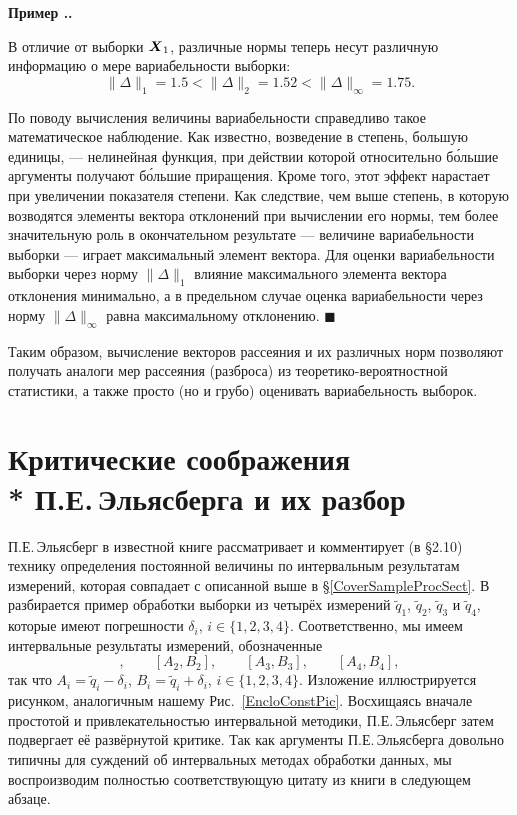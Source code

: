 \documentclass[a5paper,openany]{book}
\newcommand{\mbf}[1]{\protect\text{\boldmath$#1$}}
\newcounter{ExmpNum}[section]
\renewcommand{\theExmpNum}{\thesection.\arabic{ExmpNum}}
\newenvironment{example}%
  {\refstepcounter{ExmpNum}%
  \par\addvspace{\medskipamount} 
  \noindent\textbf{Пример {\theExmpNum}.}
  }%
  {\hfill$\blacksquare$\par\medskip}
\begin{document}
\begin{example}
В отличие от выборки $\mbf{X}_1$, различные нормы теперь несут различную информацию о мере вариабельности выборки:
\begin{equation*}
	 \| \Delta \|_1 = 1.5 <  \| \Delta \|_2 = 1.52 < \| \Delta \|_{\infty}= 1.75. 
\end{equation*}	
  
По поводу вычисления величины вариабельности справедливо такое математическое наблюдение. 
Как известно, возведение в степень, большую единицы, --- нелинейная функция, при действии 
которой относительно б\'{о}льшие аргументы получают б\'{о}льшие приращения. Кроме того, 
этот эффект нарастает при увеличении показателя степени. Как следствие, чем выше степень, 
в которую возводятся элементы вектора отклонений при вычислении его нормы, тем более 
значительную роль в окончательном результате --- величине вариабельности выборки --- 
играет максимальный элемент вектора. Для оценки вариабельности выборки через норму 
$\| \Delta \|_1$ влияние максимального элемента вектора отклонения минимально, а 
в предельном случае оценка вариабельности через норму $\| \Delta \|_{\infty}$ равна 
максимальному отклонению. 
\end{example} 
  
Таким образом, вычисление векторов рассеяния и их различных норм позволяют 
получать аналоги мер рассеяния (разброса) из теоретико-вероятностной статистики, 
а также просто (но и грубо) оценивать вариабельность выборок. 
  
  
\section[Критические соображения П.Е.\,Эльясберга и их разбор]%
        {Критические соображения\\* П.Е.\,Эльясберга и их разбор} 
  
  
П.Е.\,Эльясберг в известной книге \cite{Eliasberg83} рассматривает и комментирует 
(в \S 2.10) технику определения постоянной величины по интервальным результатам 
измерений, которая совпадает с описанной выше в  \S\ref{CoverSampleProcSect}. 
В \cite{Eliasberg83} разбирается пример обработки выборки из четырёх измерений 
$\tilde{q}_1$, $\tilde{q}_2$, $\tilde{q}_3$ и $\tilde{q}_4$, которые имеют погрешности 
$\delta_i$, $i\in\{1,2,3,4\}$. Соответственно, мы имеем интервальные результаты 
измерений, обозначенные 
\begin{equation*} 
[A_{1}, B_{1}], \qquad [A_{2}, B_{2}], \qquad [A_{3}, B_{3}],  \qquad [A_{4}, B_{4}], 
\end{equation*} 
так что $A_{i} = \tilde{q}_{i} - \delta_{i}$, $B_{i} = \tilde{q}_{i} + \delta_{i}$, 
$i\in\{1,2,3,4\}$. Изложение иллюстрируется рисунком, аналогичным нашему 
Рис.~\ref{EncloConstPic}. Восхищаясь вначале простотой и привлекательностью интервальной 
методики, П.Е.\,Эльясберг затем подвергает её развёрнутой критике. Так как аргументы 
П.Е.\,Эльясберга довольно типичны для суждений об интервальных методах обработки 
данных, мы воспроизводим полностью соответствующую цитату из книги \cite{Eliasberg83} 
в следующем абзаце. 
  
\end{document}
